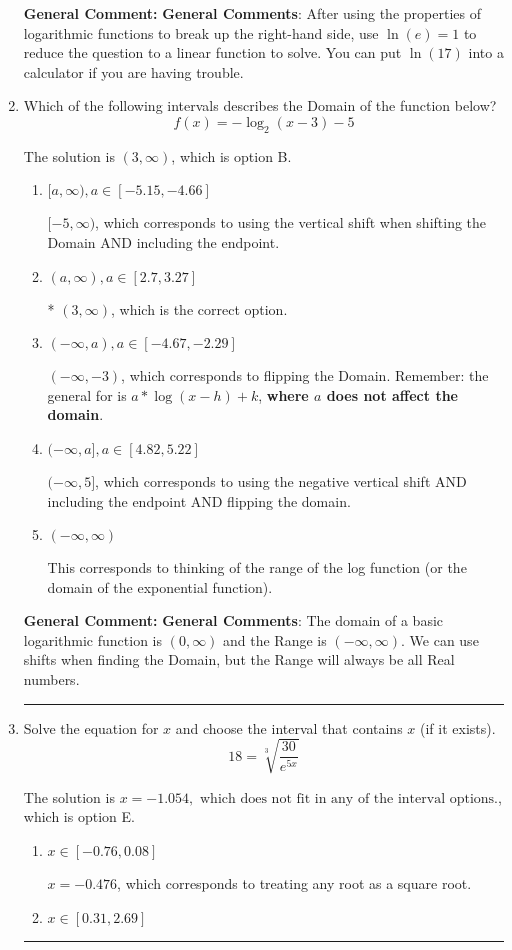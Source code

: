 \documentclass{extbook}[14pt]
\newcommand{\litem}[1]{\item #1

\rule{\textwidth}{0.4pt}}
\begin{document}
\begin{enumerate}
{\textbf{General Comment:} \textbf{General Comments}: After using the properties of logarithmic functions to break up the right-hand side, use $\ln(e) = 1$ to reduce the question to a linear function to solve. You can put $\ln(17)$ into a calculator if you are having trouble.
}
\litem{
Which of the following intervals describes the Domain of the function below?
\[ f(x) = -\log_2{(x-3)}-5 \]

The solution is \( (3, \infty) \), which is option B.\begin{enumerate}[label=\Alph*.]
\item \( [a, \infty), a \in [-5.15, -4.66] \)

$[-5, \infty)$, which corresponds to using the vertical shift when shifting the Domain AND including the endpoint.
\item \( (a, \infty), a \in [2.7, 3.27] \)

* $(3, \infty)$, which is the correct option.
\item \( (-\infty, a), a \in [-4.67, -2.29] \)

$(-\infty, -3)$, which corresponds to flipping the Domain. Remember: the general for is $a*\log(x-h)+k$, \textbf{where $a$ does not affect the domain}.
\item \( (-\infty, a], a \in [4.82, 5.22] \)

$(-\infty, 5]$, which corresponds to using the negative vertical shift AND including the endpoint AND flipping the domain.
\item \( (-\infty, \infty) \)

This corresponds to thinking of the range of the log function (or the domain of the exponential function).
\end{enumerate}

\textbf{General Comment:} \textbf{General Comments}: The domain of a basic logarithmic function is $(0, \infty)$ and the Range is $(-\infty, \infty)$. We can use shifts when finding the Domain, but the Range will always be all Real numbers.
}
\litem{
 Solve the equation for $x$ and choose the interval that contains $x$ (if it exists).
\[  18 = \sqrt[3]{\frac{30}{e^{5x}}} \]

The solution is \( x = -1.054, \text{ which does not fit in any of the interval options.} \), which is option E.\begin{enumerate}[label=\Alph*.]
\item \( x \in [-0.76, 0.08] \)

$x = -0.476$, which corresponds to treating any root as a square root.
\item \( x \in [0.31, 2.69] \)


\end{enumerate}}
\end{enumerate}
\end{document}
